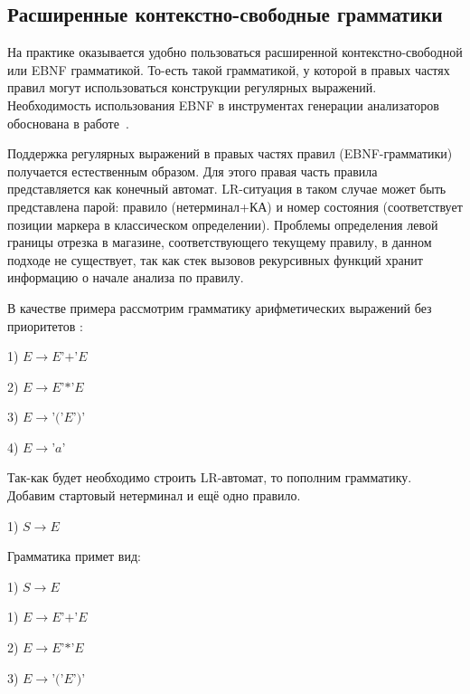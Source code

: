 \subsection{Расширенные контекстно-свободные грамматики}

На практике оказывается удобно пользоваться расширенной контекстно-свободной или EBNF грамматикой. То-есть такой грамматикой, у которой в правых частях правил могут использоваться конструкции регулярных выражений. Необходимость использования EBNF в инструментах генерации анализаторов обоснована в работе~\cite{Diploma}.

Поддержка регулярных выражений в правых частях правил (EBNF-грамматики) получается естественным образом. Для этого правая часть правила представляется как конечный автомат. LR-ситуация в таком случае может быть представлена парой: правило (нетерминал+КА) и номер состояния (соответствует позиции маркера в классическом определении). Проблемы определения левой границы отрезка в магазине, соответствующего текущему правилу, в данном подходе не существует, так как стек вызовов рекурсивных функций хранит информацию о начале анализа по правилу.

В качестве примера рассмотрим грамматику арифметических выражений без приоритетов :

\hspace{0,9cm} 1) $E \rightarrow E $'$+$'$ E$

\hspace{0,9cm} 2) $E \rightarrow E $'$*$'$ E$

\hspace{0,9cm} 3) $E \rightarrow $'$($'$E$'$)$'

\hspace{0,9cm} 4) $E \rightarrow $'$a$' 

Так-как будет необходимо строить LR-автомат, то пополним грамматику. Добавим стартовый нетерминал и ещё одно правило.

\hspace{0,9cm} 1) $S \rightarrow E$

Грамматика примет вид:

\hspace{0,9cm} 1) $S \rightarrow E$

\hspace{0,9cm} 1) $E \rightarrow E $'$+$'$ E$

\hspace{0,9cm} 2) $E \rightarrow E $'$*$'$ E$

\hspace{0,9cm} 3) $E \rightarrow $'$($'$E$'$)$'

